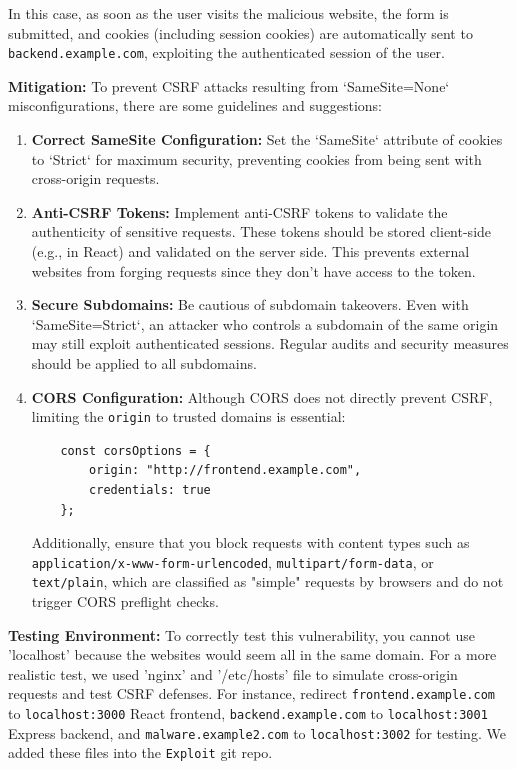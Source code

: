 \documentclass[]{article}
\begin{document}
In this case, as soon as the user visits the malicious website, the form is submitted, and cookies (including session cookies) are automatically sent to \texttt{backend.example.com}, exploiting the authenticated session of the user.

\textbf{Mitigation:}  
To prevent CSRF attacks resulting from `SameSite=None` misconfigurations, there are some guidelines and suggestions:

\begin{enumerate}
    \item \textbf{Correct SameSite Configuration:}  
    Set the `SameSite` attribute of cookies to `Strict` for maximum security, preventing cookies from being sent with cross-origin requests.
    
    \item \textbf{Anti-CSRF Tokens:}  
    Implement anti-CSRF tokens to validate the authenticity of sensitive requests. These tokens should be stored client-side (e.g., in React) and validated on the server side. This prevents external websites from forging requests since they don't have access to the token.
    
    \item \textbf{Secure Subdomains:}  
    Be cautious of subdomain takeovers. Even with `SameSite=Strict`, an attacker who controls a subdomain of the same origin may still exploit authenticated sessions. Regular audits and security measures should be applied to all subdomains.
    
    \item \textbf{CORS Configuration:}  
    Although CORS does not directly prevent CSRF, limiting the \texttt{origin} to trusted domains is essential:
    \begin{lstlisting}
    const corsOptions = {
        origin: "http://frontend.example.com",
        credentials: true
    };
    \end{lstlisting}
    Additionally, ensure that you block requests with content types such as \texttt{application/x-www-form-urlencoded}, \texttt{multipart/form-data}, or \texttt{text/plain}, which are classified as "simple" requests by browsers and do not trigger CORS preflight checks.
\end{enumerate}

\textbf{Testing Environment:}
   To correctly test this vulnerability, you cannot use 'localhost' because the websites would seem all in the same domain. For a more realistic test, we used 'nginx' and '/etc/hosts' file to simulate cross-origin requests and test CSRF defenses. For instance, redirect \texttt{frontend.example.com} to \texttt{localhost:3000} React frontend, \texttt{backend.example.com} to \texttt{localhost:3001} Express backend, and \texttt{malware.example2.com} to \texttt{localhost:3002} for testing. We added these files into the \texttt{Exploit} git repo.
\end{document}
